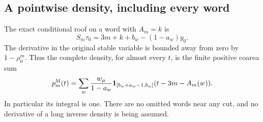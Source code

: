 \subsection{A pointwise density, including every word}
The exact conditional roof on a word with $A_m=k$ is
\[
 S_m\tau_0=3m+k+b_w-(1-a_w)y_0.
\]
The derivative in the original stable variable is bounded away from
zero by $1-\rho_0^m$. Thus the complete density, for almost every $t$,
is the finite positive coarea sum
\begin{equation}\label{eq:v59-exact-markov-density}
 p_m^{\rm M}(t)=\sum_w\frac{w_\mu}{1-a_w}
    \one_{[b_w+a_w-1,b_w]}(t-3m-A_m(w)).
\end{equation}
In particular its integral is one. There are no omitted words near
any cut, and no derivative of a long inverse density is being assumed.

